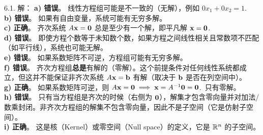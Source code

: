 \begin{exer}
\vspace{5ex}


6.1. 解： \textbf{a) 错误}。
线性方程组可能是不一致的（无解），例如 $0x_1 + 0x_2 = 1$.~
\\
\textbf{b) 错误}。
如果有自由变量，系统可能有无穷多解。
\\
\textbf{c) 正确}。
齐次系统 $A\mathbf{x} = \mathbf{0}$ 总是至少有一个解，即平凡解 $\mathbf{x} = \mathbf{0}$.~
\\
\textbf{d) 错误}。
即使方程个数等于未知数个数，如果方程之间线性相关且常数项不匹配（如平行线），系统也可能无解。
\\
\textbf{e) 错误}。
如果系数矩阵不可逆，方程组可能有无穷多解。
\\
\textbf{f) 错误}。
齐次方程组\textbf{总是}有解的（零解）。这个前提条件对任何线性系统都成立，但这并不能保证非齐次系统 $A\mathbf{x} = \mathbf{b}$ 有解（取决于 $\mathbf{b}$ 是否在列空间中）。
\\
\textbf{g) 正确}。
如果系数矩阵可逆，则 $A\mathbf{x} = \mathbf{0} \implies \mathbf{x} = A^{-1}\mathbf{0} = \mathbf{0}$.~只有零解。
\\
\textbf{h) 错误}。
只有当方程组是齐次的时候（右侧为 $\mathbf{0}$），解集才包含零向量并对加法/数乘封闭。非齐次方程组的解集不包含零向量，因此不是子空间（它是仿射子空间）。
\\
\textbf{i) 正确}。
这是核（Kernel）或零空间（Null space）的定义，它是 $\mathbb{R}^n$ 的子空间。


\end{exer}
